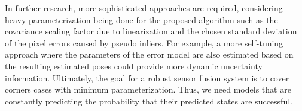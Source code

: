 \documentclass[a4paper]{report}
\numberwithin{figure}{section}
\begin{document}
In further research, more sophisticated approaches are required, considering
heavy parameterization being done for the proposed algorithm such as the covariance
scaling factor due to linearization and the chosen standard deviation of the
pixel errors caused by pseudo inliers. For example, a more self-tuning approach
where the parameters of the error model are also estimated based on the
resulting estimated poses could provide more dynamic uncertainty information.
Ultimately, the goal for a robust sensor fusion system is to cover
corners cases with minimum parameterization.  Thus, we need models that are
constantly predicting the probability that their predicted states are
successful.






\end{document}
